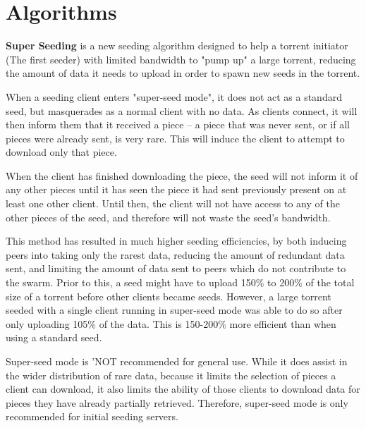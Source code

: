 \documentclass[11pt]{article}
\begin{document}
  \section*{Algorithms}
  \begin{flushleft}
    \textbf{Super Seeding} is a new seeding algorithm designed to help a torrent initiator (The first seeder) with limited bandwidth to "pump up" a large torrent, reducing the amount of data it needs to upload in order to spawn new seeds in the torrent.

  \end{flushleft}
  \begin{flushleft}

    When a seeding client enters "super-seed mode", it does not act as a standard seed, but masquerades as a normal client with no data. As clients connect, it will then inform them that it received a piece -- a piece that was never sent, or if all pieces were already sent, is very rare. This will induce the client to attempt to download only that piece.

  \end{flushleft}
  \begin{flushleft}

    When the client has finished downloading the piece, the seed will not inform it of any other pieces until it has seen the piece it had sent previously present on at least one other client. Until then, the client will not have access to any of the other pieces of the seed, and therefore will not waste the seed's bandwidth.

  \end{flushleft}
  \begin{flushleft}

    This method has resulted in much higher seeding efficiencies, by both inducing peers into taking only the rarest data, reducing the amount of redundant data sent, and limiting the amount of data sent to peers which do not contribute to the swarm. Prior to this, a seed might have to upload 150\% to 200\% of the total size of a torrent before other clients became seeds. However, a large torrent seeded with a single client running in super-seed mode was able to do so after only uploading 105\% of the data. This is 150-200\% more efficient than when using a standard seed.

  \end{flushleft}
  \begin{flushleft}

    Super-seed mode is 'NOT recommended for general use. While it does assist in the wider distribution of rare data, because it limits the selection of pieces a client can download, it also limits the ability of those clients to download data for pieces they have already partially retrieved. Therefore, super-seed mode is only recommended for initial seeding servers.

  \end{flushleft}
\end{document}

